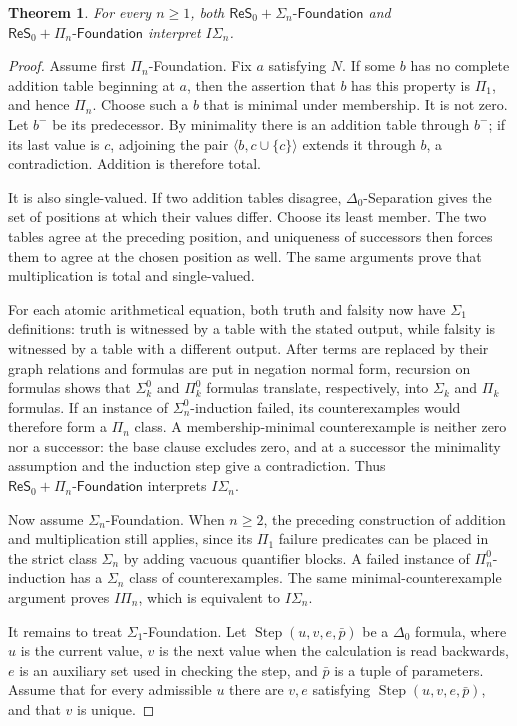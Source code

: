 \documentclass[11pt,a4paper]{article}
\newcommand{\IS}[1]{I\Sigma_{#1}}
\newcommand{\ReSzero}{\mathsf{ReS}_{0}}
\newcommand{\Fnd}[1]{#1\text{-}\mathsf{Foundation}}
\theoremstyle{plain}
\newtheorem{theorem}{Theorem}[section]
\theoremstyle{definition}
\theoremstyle{remark}
\begin{document}
\begin{theorem}
  For every \(n\geq1\), both \(\ReSzero+\Fnd{\Sigma_n}\) and
  \(\ReSzero+\Fnd{\Pi_n}\) interpret \(\IS{n}\).
\end{theorem}
\begin{proof}
  Assume first \(\Pi_n\)-Foundation. Fix \(a\) satisfying \(N\). If some \(b\) has no complete addition table beginning at \(a\), then the assertion that \(b\) has this property is \(\Pi_1\), and hence \(\Pi_n\). Choose such a \(b\) that is minimal under membership. It is not zero. Let \(b^-\) be its predecessor. By minimality there is an addition table through \(b^-\); if its last value is \(c\), adjoining the pair \(\langle b,c\cup\{c\}\rangle\) extends it through \(b\), a contradiction. Addition is therefore total.

  It is also single-valued. If two addition tables disagree, \(\Delta_0\)-Separation gives the set of positions at which their values differ. Choose its least member. The two tables agree at the preceding position, and uniqueness of successors then forces them to agree at the chosen position as well. The same arguments prove that multiplication is total and single-valued.

  For each atomic arithmetical equation, both truth and falsity now have \(\Sigma_1\) definitions: truth is witnessed by a table with the stated output, while falsity is witnessed by a table with a different output. After terms are replaced by their graph relations and formulas are put in negation normal form, recursion on formulas shows that \(\Sigma_k^0\) and \(\Pi_k^0\) formulas translate, respectively, into \(\Sigma_k\) and \(\Pi_k\) formulas. If an instance of \(\Sigma_n^0\)-induction failed, its counterexamples would therefore form a \(\Pi_n\) class. A membership-minimal counterexample is neither zero nor a successor: the base clause excludes zero, and at a successor the minimality assumption and the induction step give a contradiction. Thus \(\ReSzero+\Fnd{\Pi_n}\) interprets \(I\Sigma_n\).

  Now assume \(\Sigma_n\)-Foundation. When \(n\geq2\), the preceding construction of addition and multiplication still applies, since its \(\Pi_1\) failure predicates can be placed in the strict class \(\Sigma_n\) by adding vacuous quantifier blocks. A failed instance of \(\Pi_n^0\)-induction has a \(\Sigma_n\) class of counterexamples. The same minimal-counterexample argument proves \(I\Pi_n\), which is equivalent to \(I\Sigma_n\).

  It remains to treat \(\Sigma_1\)-Foundation. Let
  \(\operatorname{Step}(u,v,e,\bar p)\) be a \(\Delta_0\) formula, where \(u\) is the current value, \(v\) is the next value when the calculation is read backwards, \(e\) is an auxiliary set used in checking the step, and \(\bar p\) is a tuple of parameters. Assume that for every admissible \(u\) there are \(v,e\) satisfying \(\operatorname{Step}(u,v,e,\bar p)\), and that \(v\) is unique.


\end{proof}
\end{document}
